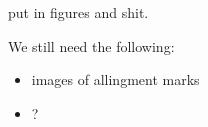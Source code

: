 

put in figures and shit.

We still need the following:
\begin{itemize}
    \item images of allingment marks
    \item ?
\end{itemize}
